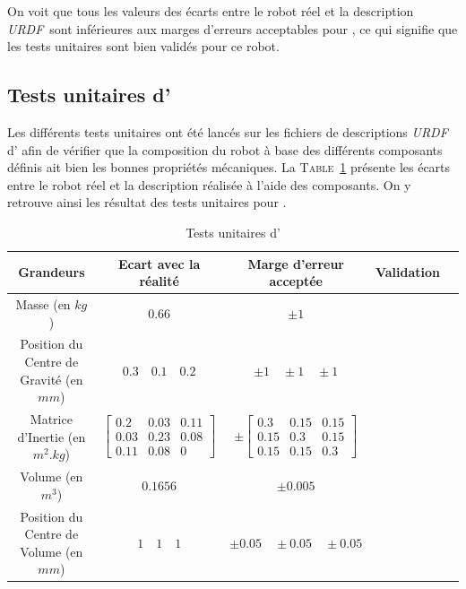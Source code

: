 			On voit que tous les valeurs des écarts entre le robot réel et la description \textit{URDF} sont inférieures aux marges d'erreurs acceptables pour \argos{}, ce qui signifie que les tests unitaires sont bien validés pour ce robot.

		\subsection{Tests unitaires d'\atoll{}}

			Les différents tests unitaires ont été lancés sur les fichiers de descriptions \textit{URDF} d'\atoll{} afin de vérifier que la composition du robot à base des différents composants définis ait bien les bonnes propriétés mécaniques. La \textsc{Table}~\ref{table:atoll_unittest} présente les écarts entre le robot réel et la description réalisée à l'aide des composants. On y retrouve ainsi les résultat des tests unitaires pour \atoll{}.
			
			\begin{table}[!htb]
				\centering
				\begin{adjustbox}{max width=\textwidth}
					\begin{tabular}{|c|c|c|c|c|}
						\hline
						\textbf{Grandeurs} & \textbf{Ecart avec la réalité} & \textbf{Marge d'erreur acceptée} & \textbf{Validation} \\
						\hline
						Masse (en $kg$) & $0.66$ & $\pm 1$ & \cmark \\
						\hline
						Position du Centre de Gravité (en $mm$) & $0.3 \quad 0.1 \quad 0.2$ & $\pm 1 \quad \pm 1 \quad \pm 1$ & \cmark \\
						\hline
						Matrice d'Inertie (en $m^2.kg$) & $\begin{bmatrix}0.2 & 0.03 & 0.11 \\ 0.03 & 0.23 & 0.08 \\ 0.11 & 0.08 & 0\end{bmatrix}$ & $\pm \begin{bmatrix}0.3 & 0.15 & 0.15 \\ 0.15 & 0.3 & 0.15 \\ 0.15 & 0.15 & 0.3\end{bmatrix}$ & \cmark \\
						\hline
						Volume (en $m^3$) & $0.1656$ & $\pm 0.005$ & \cmark \\
						\hline
						Position du Centre de Volume (en $mm$) & $1 \quad 1 \quad 1$ & $\pm 0.05 \quad \pm 0.05 \quad \pm 0.05$ & \cmark \\
						\hline
					\end{tabular}
				\end{adjustbox}
				\caption{Tests unitaires d'\atoll{}}
				\label{table:atoll_unittest}
			\end{table}

